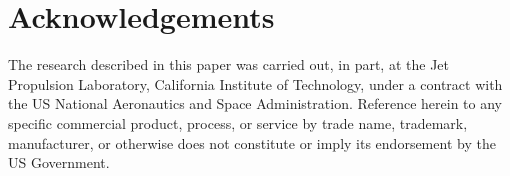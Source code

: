 \documentclass[smallcondesed]{svjour3}
\begin{document}
\section*{Acknowledgements}
 The research described in this paper was carried out, in part, at the Jet
 Propulsion Laboratory, California Institute of Technology,
 under a contract with the US National Aeronautics and
 Space Administration. Reference herein to any specific
 commercial product, process, or service by trade name,
 trademark, manufacturer, or otherwise does not constitute
or imply its endorsement by the US Government.



\vspace*{0.5mm}
\small




\balance
\end{document}

